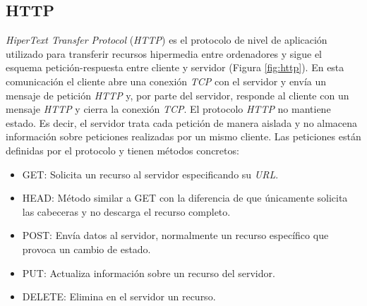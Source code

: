 \subsection{HTTP}
\label{subsec:http} 
\textit{HiperText Transfer Protocol} (\textit{HTTP}) es el protocolo de nivel de aplicación utilizado para transferir recursos hipermedia entre ordenadores y sigue el esquema petición-respuesta entre cliente y servidor (Figura \ref{fig:http}). En esta comunicación el cliente abre una conexión \textit{TCP} con el servidor y envía un mensaje de petición \textit{HTTP} y, por parte del servidor, responde al cliente con un mensaje \textit{HTTP} y cierra la conexión \textit{TCP}. 
El protocolo \textit{HTTP} no mantiene estado. Es decir, el servidor trata cada petición de manera aislada y no almacena información sobre peticiones realizadas por un mismo cliente. 
Las peticiones están definidas por el protocolo y tienen métodos concretos: 
\begin{itemize}
    \item GET: Solicita un recurso al servidor especificando su \textit{URL}.
    \item HEAD: Método similar a GET con la diferencia de que únicamente solicita las cabeceras y no descarga el recurso completo.
    \item POST: Envía datos al servidor, normalmente un recurso específico que provoca un cambio de estado. 
    \item PUT: Actualiza información sobre un recurso del servidor. 
    \item DELETE: Elimina en el servidor un recurso.
\end{itemize}

